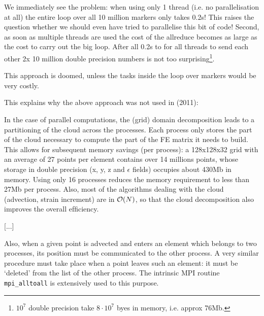 We immediately see the problem: when using only 1 thread (i.e. no parallelisation 
at all) the entire loop over all 10 million markers only takes 0.2s! 
This raises the question whether we should even have tried to parallelise this 
bit of code! 
Second, as soon as multiple threads are used the cost of the allreduce becomes 
as large as the cost to carry out the big loop. After all 0.2s to for all threads 
to send each other 2x 10 million double precision numbers is not too 
surprising\footnote{$10^7$ double precision take $8\cdot 10^7$ byes in memory, 
i.e. approx 76Mb.}.


This approach is doomed, unless the tasks inside the loop over markers would be 
very costly.

This explains why the above approach was not used in \textcite{thie11} (2011):
\begin{displayquote}
{\color{darkgray} 
In the case of parallel computations, the (grid) domain decomposition leads 
to a partitioning of
the cloud across the processes. Each process only stores the part of
the cloud necessary to compute the part of the FE matrix it needs
to build. This allows for subsequent memory savings (per process):
a 128x128x32 grid with an average of 27 points per element
contains over 14 millions points, whose storage in double precision
(x, y, z and $\epsilon$ fields) occupies about 430Mb in memory. Using only
16 processes reduces the memory requirement to less than 27Mb
per process. Also, most of the algorithms dealing with the cloud
(advection, strain increment) are in ${\cal O}(N)$, so that the cloud decomposition 
also improves the overall efﬁciency.

[...]

Also, when a given
point is advected and enters an element which belongs to two processes, 
its position must be communicated to the other process. A
very similar procedure must take place when a point leaves such
an element: it must be ‘deleted’ from the list of the other process.
The intrinsic MPI routine \verb|mpi_alltoall| is extensively used to this
purpose.
}
\end{displayquote}






